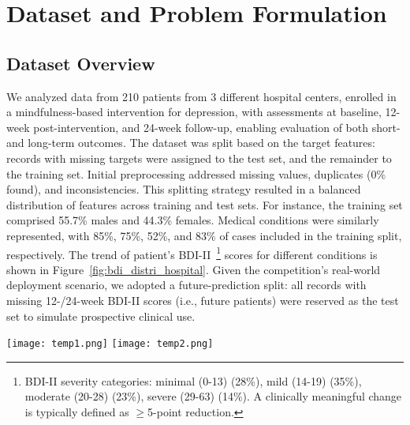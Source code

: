 \documentclass[conference]{IEEEtran}
\begin{document}
\section{Dataset and Problem Formulation}

\subsection{Dataset Overview}


We analyzed data from 210 patients from 3 different hospital centers, enrolled in a mindfulness-based intervention for depression, with assessments at baseline, 12-week post-intervention, and 24-week follow-up, enabling evaluation of both short- and long-term outcomes. The dataset was split based on the target features: records with missing targets were assigned to the test set, and the remainder to the training set. Initial preprocessing addressed missing values, duplicates (0\% found), and inconsistencies. This splitting strategy resulted in a balanced distribution of features across training and test sets. For instance, the training set comprised 55.7\% males and 44.3\% females. Medical conditions were similarly represented, with 85\%, 75\%, 52\%, and 83\% of cases included in the training split, respectively. The trend of patient's BDI-II~\footnote{BDI-II severity categories: minimal (0-13) (28\%), mild (14-19) (35\%), moderate (20-28) (23\%), severe (29-63) (14\%). A clinically meaningful change is typically defined as $\ge$5-point reduction.} scores for different conditions is shown in Figure~\ref{fig:bdi_distri_hospital}. Given the competition’s real-world deployment scenario, we adopted a future-prediction split: all records with missing 12-/24-week BDI-II scores (i.e., future patients) were reserved as the test set to simulate prospective clinical use.

\begin{figure*}
    \centering
    \texttt{[image: temp1.png]}
    \texttt{[image: temp2.png]}
    \caption{Comparison of BDI-II scores at baseline, 12-week, and 24-week follow-up, visualizing the score trends for all types of conditions (Cancer, Lower-Limb Amputation, Renal Insufficiency, Acute Coronary Syndrome).}
    \label{fig:bdi_distri_hospital}
\end{figure*}
\end{document}
